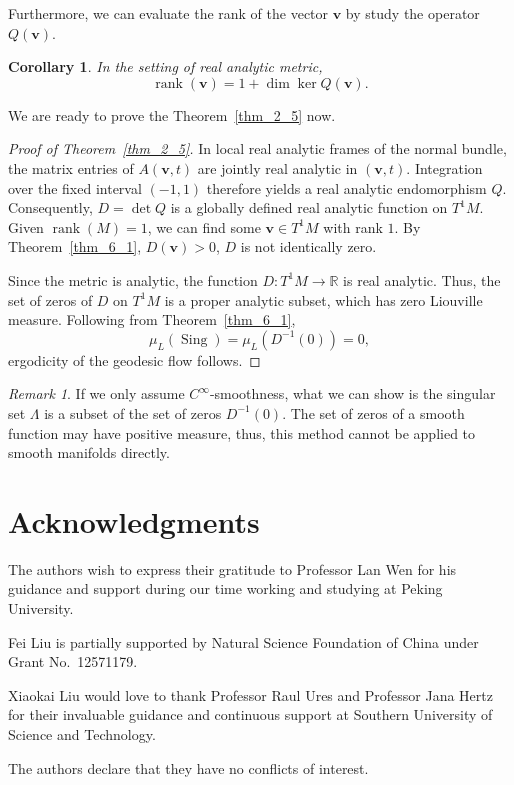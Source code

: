 \documentclass[reqno,11pt]{article}
\newtheorem{corollary}{Corollary}[section]
\theoremstyle{definition}
\theoremstyle{remark}
\newtheorem*{remark}{Remark}
\numberwithin{equation}{section}
\DeclareMathOperator{\rank}{rank}
\DeclareMathOperator{\sing}{Sing}
\begin{document}
Furthermore, we can evaluate the rank of the vector $\bm{v}$ by study the operator $Q(\bm{v})$.

\begin{corollary}
	In the setting of real analytic metric,
	\begin{displaymath}
		\rank(\bm{v})=1+\dim\ker Q(\bm{v}).
	\end{displaymath}
\end{corollary}

We are ready to prove the Theorem~\ref{thm_2_5} now.

\begin{proof}[Proof of Theorem~\ref{thm_2_5}]
	In local real analytic frames of the normal bundle, the matrix entries of $A(\bm{v},t)$ are jointly real analytic in $(\bm{v},t)$. Integration over the fixed interval $(-1,1)$ therefore yields a real analytic endomorphism $Q$. Consequently, $D=\det Q$ is a globally defined real analytic function on $T^{1}M$.
	Given $\rank(M)=1$, we can find some $\bm{v}\in T^{1}M$ with rank $1$. By Theorem~\ref{thm_6_1}, $D(\bm{v})>0$, $D$ is not identically zero.

	Since the metric is analytic, the function $D:T^{1}M\to \mathbb{R}$ is real analytic. Thus, the set of zeros of $D$ on $T^1 M$ is a proper analytic subset, which has zero Liouville measure. Following from Theorem~\ref{thm_6_1},
	\begin{displaymath}
		\mu_{L}(\sing)=\mu_{L}(D^{-1}(0))=0,
	\end{displaymath}
	ergodicity of the geodesic flow follows.
\end{proof}

\begin{remark}
	If we only assume $C^{\infty}$-smoothness, what we can show is the singular set $\Lambda$ is a subset of the set of zeros $D^{-1}(0)$. The set of zeros of a smooth function may have positive measure, thus, this method cannot be applied to smooth manifolds directly.
\end{remark}

\section*{Acknowledgments}
The authors wish to express their gratitude to Professor Lan Wen for his guidance and support during our time working and studying at Peking University.

Fei Liu is partially supported by Natural Science Foundation of China under Grant No.~12571179.

Xiaokai Liu would love to thank Professor Raul Ures and Professor Jana Hertz for their invaluable guidance and continuous support at Southern University of Science and Technology.

 The authors declare that they have no conflicts of interest.

\newpage
\printbibliography
\end{document}
